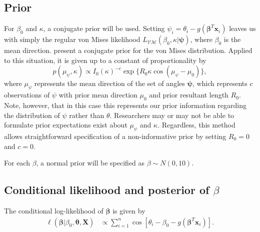 \documentclass[12pt,a4paper]{article}\usepackage[]{graphicx}\usepackage[]{color}
\begin{document}
\subsection{Prior}

For $\beta_0$ and $\kappa$, a conjugate prior will be used. Setting $\psi_i = \theta_i - g(\boldsymbol\beta^T \boldsymbol{x}_i)$ leaves us with simply the regular von Mises likelihood $L_{\mathcal{VM}}(\beta_0, \kappa \vert \boldsymbol\psi)$, where $\beta_0$ is the mean direction. \citet{guttorp1988finding} present a conjugate prior for the von Mises distribution. Applied to this situation, it is given up to a constant of proportionality by
\begin{equation}
p(\mu_{\psi}, \kappa) \propto  I_0 (\kappa) ^{-c} \exp\{R_0 \kappa \cos (\mu_{\psi} - \mu_0)\},
\end{equation}
where $\mu_{\psi}$ represents the mean direction of the set of angles $\boldsymbol\psi$,  which represents $c$ observations of $\psi$ with prior mean direction $\mu_0$ and prior resultant length $R_0$. Note, however, that in this case this represents our prior information regarding the distribution of $\psi$ rather than $\theta$. Researchers may or may not be able to formulate prior expectations exist about $\mu_{\psi}$ and $\kappa$. Regardless, this method allows straightforward specification of a non-informative prior by setting $R_0 = 0$ and $c = 0$.

For each $\beta$, a normal prior will be specified as $\beta \sim N(0, 10)$.



\subsection{Conditional likelihood and posterior of $\beta$}



The conditional log-likelihood of $\boldsymbol{\beta}$ is %
given by
\begin{align}
\ell (\boldsymbol{\beta} \vert \beta_0, \boldsymbol{\theta}, \boldsymbol{X}) &\propto
\sum_{i=1}^{n} \cos \left[ \theta_i - \beta_0 - g(\boldsymbol\beta^T \boldsymbol{x}_i) \right].
\end{align}
\end{document}
